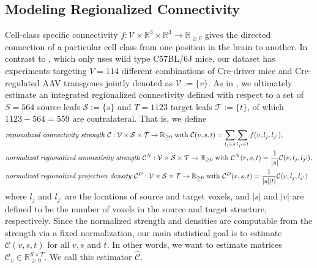\newpage

\subsection{Modeling Regionalized Connectivity}
\label{sec:modelling}

Cell-class specific connectivity $f:  \mathcal V \times \mathbb R^3 \times \mathbb R^3 \to \mathbb R_{\geq 0}$ gives the directed connection of a particular cell class from one position in the brain to another.
In contrast to \citet{Knox2019-ot}, which only uses wild type C57BL/6J mice, our dataset has experiments targeting $V = 114$ different combinations of Cre-driver mice and Cre-regulated AAV transgenes jointly denoted as $\mathcal V := \{v\}$.
As in \citet{Knox2019-ot}, we ultimately estimate an integrated regionalized connectivity defined with respect to a set of $S = 564$ source leafs $\mathcal S := \{ s\} $ and $T = 1123$ target leafs $\mathcal T := \{ t \}$, of which $1123 - 564  = 559$ are contralateral.
That is, we define
\begin{align*}
&\text{\textit {regionalized connectivity strength} } \mathcal C : \mathcal V \times \mathcal S \times \mathcal T \to \mathbb R_{\geq 0}  \text{ with } \mathcal C(v,s,t) = \sum_{l_{j} \in s} \sum_{l_{j'} \in  t} f(v,l_{j},l_{j'}), \\
&\text{\textit {normalized regionalized connectivity strength} } \mathcal C^N : \mathcal V \times \mathcal S \times \mathcal T \to \mathbb R_{\geq 0}  \text{ with } \mathcal C^N(v,s,t) = \frac{1}{|s|} \mathcal C(v,l_{j},l_{j'}), \\
&\text{\textit {normalized regionalized projection density} } \mathcal C^D : \mathcal V \times \mathcal S \times \mathcal T \to \mathbb R_{\geq 0} \text{ with } \mathcal C^D(v,s,t) = \frac{1}{| s | | t|}\mathcal C(v,l_{j},l_{j'})
\end{align*}
where $l_j$ and $l_{j'}$ are the locations of source and target voxels, and $|s|$ and $|v|$ are defined to be the number of voxels in the source and target structure, respectively.
Since the normalized strength and densities are computable from the strength via a fixed normalization, our main statistical goal is to estimate $\mathcal C (v,s,t) $ for all $v, s$ and $t$.%
In other words, we want to estimate matrices $\mathcal C_v \in \mathbb R_{\geq 0}^{S \times T}$.
We call this estimator $\widehat { \mathcal C } $.

